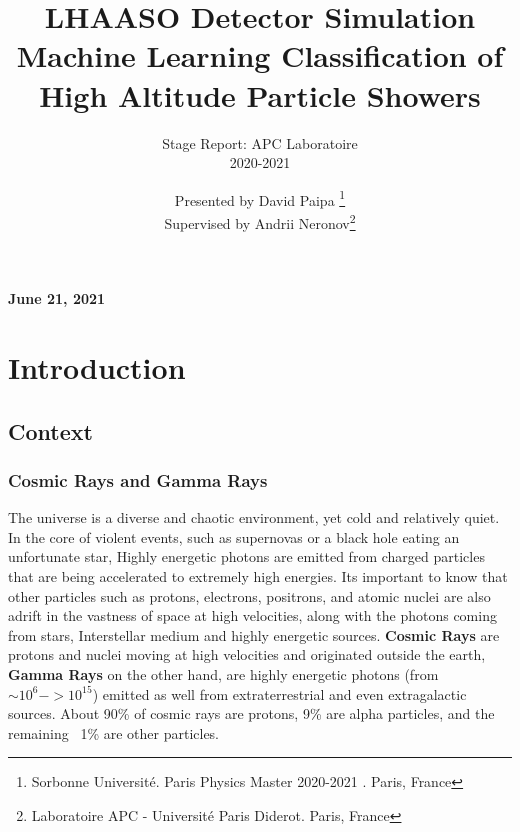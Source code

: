 \documentclass{article}
\title{\textbf{LHAASO Detector Simulation\\ \large{Machine Learning Classification of High Altitude Particle Showers }}}
\author{Stage Report: APC Laboratoire\\ 2020-2021}
\date{Presented by David Paipa \thanks{Sorbonne Université. Paris Physics Master 2020-2021 . Paris, France}\\
\small{Supervised by Andrii Neronov\thanks{Laboratoire APC - Université Paris Diderot. Paris, France}}
}
\begin{document}
\maketitle
\vspace{10cm}
\begin{center}
\textbf{ June 21, 2021 }   
\end{center}



   
   
   
   

\newpage

\tableofcontents
\newpage



\section{Introduction}
\subsection{Context}

\subsubsection{Cosmic Rays and Gamma Rays}
The universe is a diverse and chaotic environment, yet cold and relatively quiet. In the core of violent events, such as supernovas or a black hole eating an unfortunate star, Highly energetic photons are emitted from charged particles that are being accelerated to extremely high energies. Its important to know that other particles such as protons, electrons, positrons, and atomic nuclei are also adrift in the vastness of space at high velocities, along with the photons coming from stars, Interstellar medium and highly energetic sources. \textbf{Cosmic Rays} are protons and nuclei moving at high velocities and originated outside the earth, \textbf{Gamma Rays} on the other hand, are highly energetic photons (from $\sim 10^{6} - > 10^{15} $) emitted as well from extraterrestrial and even extragalactic sources.
 About 90\% of cosmic rays are protons, 9\% are alpha particles, and the remaining ~1\% are other particles.
\end{document}
